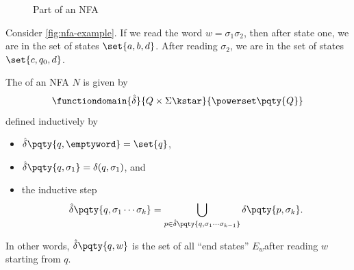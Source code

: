 \begin{figure}[ht!]
    \centering
    \caption{Part of an NFA}
    \label{fig:nfa-example}%
\end{figure}

\begin{example*}
    Consider \autoref{fig:nfa-example}. If we read the word \(w = \sigma_1 \sigma_2\), then after state one, we are in the set of states \(\set{a, b, d}\). After reading \(\sigma_2\), we are in the set of states \(\set{c, q_0, d}\).
\end{example*}

\begin{definition}
    \label{def:extended-transition-function-nfa}%
    The  of an NFA \(N\) is given by
    \[
        \functiondomain{\hat{\delta}}{Q \times \Sigma\kstar}{\powerset\pqty{Q}}
    \]
    defined inductively by
    \begin{itemize}
        \item \(\hat{\delta} \pqty{q, \emptyword} = \set{q}\),
        \item \(\hat{\delta} \pqty{q, \sigma_1} = \delta(q, \sigma_1)\), and
        \item the inductive step
        \[
        \hat{\delta} \pqty{q, \sigma_1 \cdots \sigma_k} = \bigcup_{p \in \hat{\delta}\pqty{q, \sigma_1 \cdots \sigma_{k - 1}}} \delta\pqty{p, \sigma_k}.
        \]
    \end{itemize}
\end{definition}

In other words, \(\hat{\delta}\pqty{q, w}\) is the set of all ``end states'' \(E_w\)after reading \(w\) starting from \(q\).

